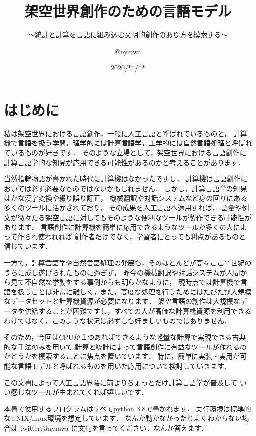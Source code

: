 \documentclass[11pt]{report}
\title{架空世界創作のための言語モデル}
\subtitle{〜統計と計算を言語に組み込む文明的創作のあり方を模索する〜}
\author{@nymwa}
\date{2020/**/**}
\begin{document}
\maketitle

\renewcommand{\contentsname}{目次}
\tableofcontents

\chapter{はじめに}

私は架空世界における言語創作，一般に人工言語と呼ばれているものと，
計算機で言語を扱う学問，理学的には計算言語学，工学的には自然言語処理と呼ばれているものが好きです．
そのような立場として，架空世界における言語創作に計算言語学的な知見が応用できる可能性があるのかと考えることがあります．

当然指輪物語が書かれた時代に計算機はなかったですし，
計算機は言語創作においては必ず必要なものではないかもしれません．
しかし，計算言語学の知見はかな漢字変換や綴り誤り訂正，
機械翻訳や対話システムなど身の回りにある多くのツールに活かされており，
その成果を人工言語へ適用すれば，
語彙や例文が微々たる架空言語に対してもそのような便利なツールが製作できる可能性があります．
言語創作に計算機を簡単に応用できるようなツールが多くの人によって作られ使われれば
創作者だけでなく，学習者にとっても利点があるものと信じています．

一方で，計算言語学や自然言語処理の発展も，そのほとんどが高々ここ半世紀のうちに成し遂げられたものに過ぎず，
昨今の機械翻訳や対話システムが人間から見て不自然な挙動をする事例からも明らかなように，
現時点では計算機で言語を扱うことは非常に難しく，また，高度な処理を行うためにはたびたび大規模なデータセットと計算機資源が必要になります．
架空言語の創作は大規模なデータを供給することが困難ですし，すべての人が高価な計算機資源を利用できるわけではなく，このような状況は必ずしも好ましいものではありません．

そのため，今回はCPUが１つあればできるような軽量な計算で実現できる古典的な手法のみを用いて
計算と統計によって言語創作に有益なツールが作れるのかどうかを模索することに焦点を置いています．
特に，簡単に実装・実用が可能な言語モデルと呼ばれるものを用いた応用について検討していきます．

この文書によって人工言語界隈に前よりちょっとだけ計算言語学が普及して
いい感じなツールが生まれてくれば嬉しいです．

本書で使用するプログラムはすべてpython 3.8で書かれます．
実行環境は標準的なUNIX/linux環境を想定しています．
なんか動かなかったりよくわからない場合は twitter:@nymwa に文句を言ってください．なんか答えます．
\end{document}
